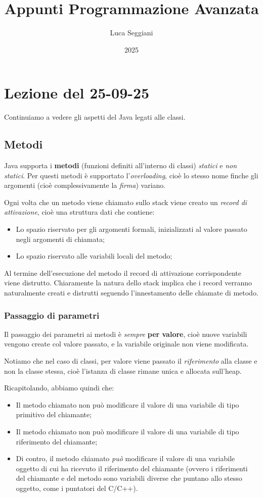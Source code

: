 \documentclass[a4paper,11pt]{article}
\title{Appunti Programmazione Avanzata}
\author{Luca Seggiani}
\date{2025}
\begin{document}
\section{Lezione del 25-09-25}

\thispagestyle{empty}
\pagestyle{fancy}

Continuiamo a vedere gli aspetti del Java legati alle classi.

\subsection{Metodi}
Java supporta i \textbf{metodi} (funzioni definiti all'interno di classi) \textit{statici} e \textit{non statici}.
Per questi metodi è supportato l'\textit{overloading}, cioè lo stesso nome finche gli argomenti (cioè complessivamente la \textit{firma}) variano.

Ogni volta che un metodo viene chiamato sullo stack viene creato un \textit{record di attivazione}, cioè una struttura dati che contiene:
\begin{itemize}
	\item Lo spazio riservato per gli argomenti formali, inizializzati al valore passato negli argomenti di chiamata;
	\item Lo spazio riservato alle variabili locali del metodo;
\end{itemize}

Al termine dell'esecuzione del metodo il record di attivazione corrispondente viene distrutto.
Chiaramente la natura dello stack implica che i record verranno naturalmente creati e distrutti seguendo l'innestamento delle chiamate di metodo.

\subsubsection{Passaggio di parametri}
Il passaggio dei parametri ai metodi è \textit{sempre} \textbf{per valore}, cioè nuove variabili vengono create col valore passato, e la variabile originale non viene modificata.

Notiamo che nel caso di classi, per valore viene passato il \textit{riferimento} alla classe e non la classe stessa, cioè l'istanza di classe rimane unica e allocata sull'heap.

Ricapitolando, abbiamo quindi che:
\begin{itemize}
	\item Il metodo chiamato non può modificare il valore di una variabile di tipo primitivo del chiamante;
	\item Il metodo chiamato non può modificare il valore di una variabile di tipo riferimento del chiamante;
	\item Di contro, il metodo chiamato \textit{può} modificare il valore di una variabile oggetto di cui ha ricevuto il riferimento del chiamante (ovvero i riferimenti del chiamante e del metodo sono variabili diverse che puntano allo stesso oggetto, come i puntatori del C/C++).
\end{itemize}
\end{document}
